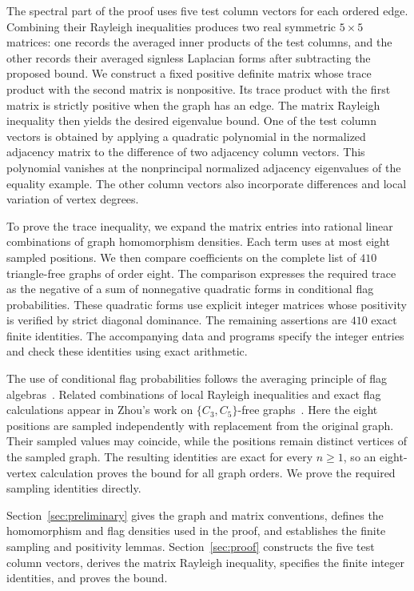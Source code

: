 \documentclass[11pt]{article}
\begin{document}
The spectral part of the proof uses five test column vectors for each ordered
edge. Combining their Rayleigh inequalities produces two real symmetric
$5\times5$ matrices: one records the averaged inner products of the test
columns, and the other records their averaged signless Laplacian forms
after subtracting the proposed bound. We construct a fixed positive
definite matrix whose trace product with the second matrix is
nonpositive. Its trace product with the first matrix is strictly positive
when the graph has an edge. The matrix Rayleigh inequality then yields
the desired eigenvalue bound. One of the test column vectors is obtained by
applying a quadratic polynomial in the normalized adjacency matrix to
the difference of two adjacency column vectors. This polynomial vanishes at
the nonprincipal normalized adjacency eigenvalues of the equality
example. The other column vectors also incorporate differences and local
variation of vertex degrees.

To prove the trace inequality, we expand the matrix entries into rational
linear combinations of graph homomorphism densities. Each term uses at
most eight sampled positions. We then compare coefficients on the
complete list of $410$ triangle-free graphs of order eight. The
comparison expresses the required trace as the negative of a sum of
nonnegative quadratic forms in conditional flag probabilities. These
quadratic forms use explicit integer matrices whose positivity is
verified by strict diagonal dominance. The remaining assertions are
$410$ exact finite identities. The accompanying data and programs
specify the integer entries and check these identities using exact
arithmetic.

The use of conditional flag probabilities follows the averaging principle
of flag algebras~\cite{Razborov}. Related combinations of local Rayleigh
inequalities and exact flag calculations appear in Zhou's work on
$\{C_3,C_5\}$-free graphs~\cite{Zhou}. Here the eight positions are sampled
independently with replacement from the original graph. Their sampled
values may coincide, while the positions remain distinct vertices of
the sampled graph. The resulting identities are exact for every
$n\geq1$, so an eight-vertex calculation proves the bound for all graph
orders. We prove the required sampling identities directly.

Section~\ref{sec:preliminary} gives the graph and matrix conventions,
defines the homomorphism and flag densities used in the proof, and
establishes the finite sampling and positivity lemmas.
Section~\ref{sec:proof} constructs the five test column vectors, derives the
matrix Rayleigh inequality, specifies the finite integer identities,
and proves the bound.
\end{document}
